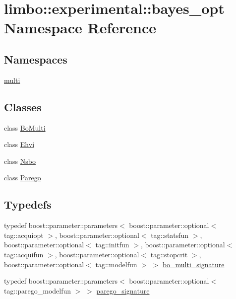 \hypertarget{namespacelimbo_1_1experimental_1_1bayes__opt}{}\section{limbo\+:\+:experimental\+:\+:bayes\+\_\+opt Namespace Reference}
\label{namespacelimbo_1_1experimental_1_1bayes__opt}
\subsection*{Namespaces}
\begin{DoxyCompactItemize}
\item 
 \hyperlink{namespacelimbo_1_1experimental_1_1bayes__opt_1_1multi}{multi}
\end{DoxyCompactItemize}
\subsection*{Classes}
\begin{DoxyCompactItemize}
\item 
class \hyperlink{classlimbo_1_1experimental_1_1bayes__opt_1_1_bo_multi}{Bo\+Multi}
\item 
class \hyperlink{classlimbo_1_1experimental_1_1bayes__opt_1_1_ehvi}{Ehvi}
\item 
class \hyperlink{classlimbo_1_1experimental_1_1bayes__opt_1_1_nsbo}{Nsbo}
\item 
class \hyperlink{classlimbo_1_1experimental_1_1bayes__opt_1_1_parego}{Parego}
\end{DoxyCompactItemize}
\subsection*{Typedefs}
\begin{DoxyCompactItemize}
\item 
typedef boost\+::parameter\+::parameters$<$ boost\+::parameter\+::optional$<$ tag\+::acquiopt $>$, boost\+::parameter\+::optional$<$ tag\+::statsfun $>$, boost\+::parameter\+::optional$<$ tag\+::initfun $>$, boost\+::parameter\+::optional$<$ tag\+::acquifun $>$, boost\+::parameter\+::optional$<$ tag\+::stopcrit $>$, boost\+::parameter\+::optional$<$ tag\+::modelfun $>$ $>$ \hyperlink{namespacelimbo_1_1experimental_1_1bayes__opt_a6dc573f8069efe3be8c162d741c645c5}{bo\+\_\+multi\+\_\+signature}
\item 
typedef boost\+::parameter\+::parameters$<$ boost\+::parameter\+::optional$<$ tag\+::parego\+\_\+modelfun $>$ $>$ \hyperlink{namespacelimbo_1_1experimental_1_1bayes__opt_aa1bdc78504860120d6bc0f395f986f57}{parego\+\_\+signature}
\end{DoxyCompactItemize}



